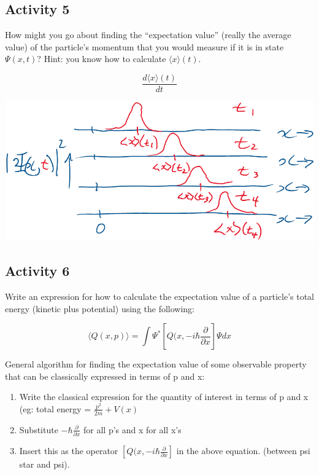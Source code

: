 \documentclass{article}
\begin{document}
\subsection{Activity 5}

How might you go about finding the “expectation value” (really the average value) of the particle’s momentum that you would measure if it is in state $\Psi(x,t)$?  Hint: you know how to calculate $\langle x \rangle (t)$. 

$$\frac{d \langle x \rangle (t)}{dt}$$

\includegraphics[width = 0.6 \textwidth]{Lecture03/2.png}


\subsection{Activity 6}

Write an expression for how to calculate the expectation value of a particle’s total energy (kinetic plus potential) using the following:

$$\langle Q(x,p) \rangle = \int \Psi^* \left[ Q(x, -i \hbar \frac{\partial}{\partial x} \right] \Psi dx$$

General algorithm for finding the expectation value of some observable property that can be classically expressed in terms of p and x:

\begin{enumerate}
    \item Write the classical expression for the quantity of interest in terms of p and x (eg: total energy = $\frac{p^2}{2m} + V(x)$
    \item Substitute $- \hbar \frac{\partial}{\partial x}$ for all p's and x for all x's
    \item Insert this as the operator $\left[ Q(x, -i \hbar \frac{\partial}{\partial x} \right]$ in the above equation. (between psi star and psi). 
\end{enumerate}
\end{document}
